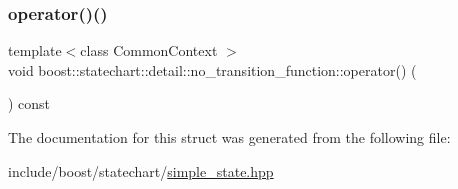 \subsubsection{\texorpdfstring{operator()()}{operator()()}}
{\footnotesize\ttfamily template$<$class Common\+Context $>$ \\
void boost\+::statechart\+::detail\+::no\+\_\+transition\+\_\+function\+::operator() (\begin{DoxyParamCaption}\item[{Common\+Context \&}]{ }\end{DoxyParamCaption}) const\hspace{0.3cm}{\ttfamily [inline]}}



The documentation for this struct was generated from the following file\+:\begin{DoxyCompactItemize}
\item 
include/boost/statechart/\mbox{\hyperlink{simple__state_8hpp}{simple\+\_\+state.\+hpp}}\end{DoxyCompactItemize}
